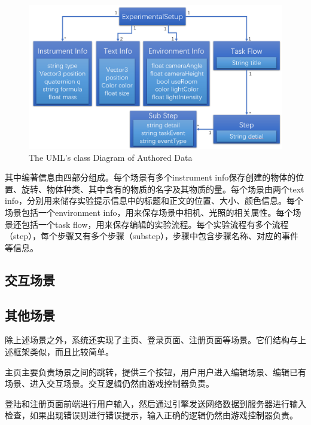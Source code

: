 \begin{figure}[!htp]
  \centering
  \includegraphics[width=12cm]{figure/setupclass.png}
    {The UML's class Diagram of Authored Data}
 \label{fig:uml}
\end{figure}

其中编著信息由四部分组成。每个场景有多个instrument info保存创建的物体的位置、旋转、物体种类、其中含有的物质的名字及其物质的量。每个场景由两个text info，分别用来储存实验提示信息中的标题和正文的位置、大小、颜色信息。每个场景包括一个environment info，用来保存场景中相机、光照的相关属性。每个场景还包括一个task flow，用来保存编辑的实验流程。每个实验流程有多个流程（step），每个步骤又有多个步骤（substep），步骤中包含步骤名称、对应的事件等信息。

\subsection{交互场景}
\subsection{其他场景}
除上述场景之外，系统还实现了主页、登录页面、注册页面等场景。它们结构与上述框架类似，而且比较简单。

主页主要负责场景之间的跳转，提供三个按钮，用户用户进入编辑场景、编辑已有场景、进入交互场景。交互逻辑仍然由游戏控制器负责。

登陆和注册页面前端进行用户输入，然后通过引擎发送网络数据到服务器进行输入检查，如果出现错误则进行错误提示，输入正确的逻辑仍然由游戏控制器负责。

